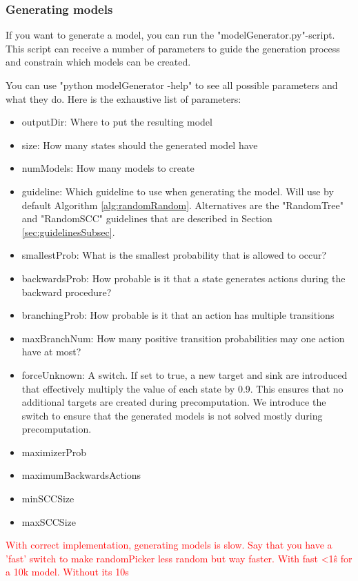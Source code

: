 \subsubsection*{Generating models}
If you want to generate a model, you can run the "modelGenerator.py"-script.
This script can receive a number of parameters to guide the generation process and constrain which models can be created.

You can use "python modelGenerator -help" to see all possible parameters and what they do.
Here is the exhaustive list of parameters:
\begin{itemize} \label{list:params}
    \item outputDir: Where to put the resulting model
    \item size: How many states should the generated model have
    \item numModels: How many models to create
    \item guideline: Which guideline to use when generating the model. Will use by default Algorithm \ref{alg:randomRandom}.
    Alternatives are the "RandomTree" and "RandomSCC" guidelines that are described in Section \ref{sec:guidelinesSubsec}.
    \item smallestProb: What is the smallest probability that is allowed to occur?
    \item backwardsProb: How probable is it that a state generates actions during the backward procedure?
    \item branchingProb: How probable is it that an action has multiple transitions
    \item maxBranchNum: How many positive transition probabilities may one action have at most?
    \item forceUnknown: A switch. If set to true, a new target and sink are introduced that effectively multiply the value of each state by 0.9.
    This ensures that no additional targets are created during precomputation. 
    We introduce the switch to ensure that the generated models is not solved mostly during precomputation.
    \item maximizerProb
    \item maximumBackwardsActions
    \item minSCCSize
    \item maxSCCSize
\end{itemize}
\textcolor{red}{With correct implementation, generating models is slow. Say that you have a 'fast' switch to make randomPicker less random but way faster.
With fast <1ŝ for a 10k model. Without its 10s}

